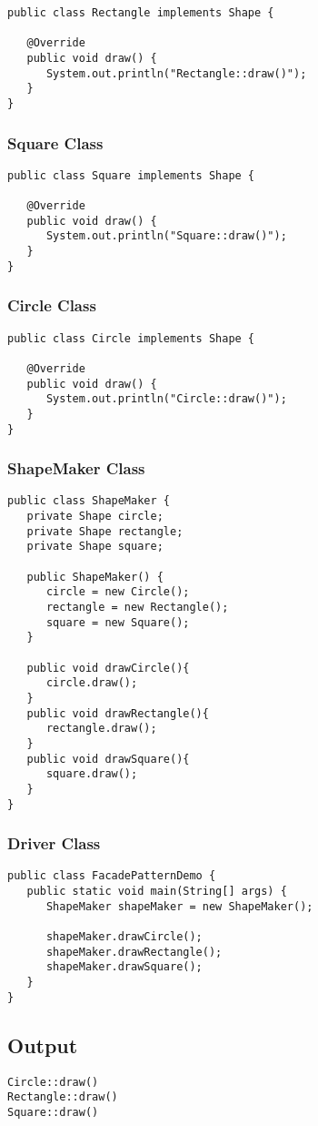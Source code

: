 \begin{verbatim}
public class Rectangle implements Shape {

   @Override
   public void draw() {
      System.out.println("Rectangle::draw()");
   }
}
\end{verbatim}

\subsubsection{Square Class}

\begin{verbatim}
public class Square implements Shape {

   @Override
   public void draw() {
      System.out.println("Square::draw()");
   }
}
\end{verbatim}

\subsubsection{Circle Class}

\begin{verbatim}
public class Circle implements Shape {

   @Override
   public void draw() {
      System.out.println("Circle::draw()");
   }
}
\end{verbatim}

\subsubsection{ShapeMaker Class}

\begin{verbatim}
public class ShapeMaker {
   private Shape circle;
   private Shape rectangle;
   private Shape square;

   public ShapeMaker() {
      circle = new Circle();
      rectangle = new Rectangle();
      square = new Square();
   }

   public void drawCircle(){
      circle.draw();
   }
   public void drawRectangle(){
      rectangle.draw();
   }
   public void drawSquare(){
      square.draw();
   }
}
\end{verbatim}

\subsubsection{Driver Class}

\begin{verbatim}
public class FacadePatternDemo {
   public static void main(String[] args) {
      ShapeMaker shapeMaker = new ShapeMaker();

      shapeMaker.drawCircle();
      shapeMaker.drawRectangle();
      shapeMaker.drawSquare();		
   }
}
\end{verbatim}

\subsection{Output}

\begin{verbatim}
Circle::draw()
Rectangle::draw()
Square::draw()
\end{verbatim}
